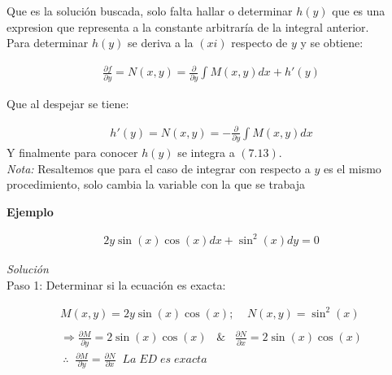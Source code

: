 Que es la solución buscada, solo falta hallar o determinar \(\displaystyle h(y)\) que es una expresion que representa a la constante arbitraría de la integral anterior.\\

Para determinar \(\displaystyle h(y)\) se deriva a la \(\displaystyle (xi)\) respecto de \(\displaystyle y\) y se obtiene:

\begin{equation}
    \begin{gathered}
        \frac{\partial{f}}{\partial{y}}=N(x,y)=\frac{\partial}{\partial{y}}\int M(x,y)dx + h'(y)
    \end{gathered}
\end{equation}

Que al despejar se tiene:

\begin{equation}
    \begin{gathered}
        h'(y)=N(x,y)=-\frac{\partial}{\partial{y}}\int M(x,y)dx
    \end{gathered}
\end{equation}
Y finalmente para conocer \(\displaystyle h(y)\) se integra a \(\displaystyle (7.13)\).\\

\textit{Nota: }Resaltemos que para el caso de integrar con respecto a \(\displaystyle y\) es el mismo procedimiento, solo cambia la variable con la que se trabaja

\clearpage

\textbf{Ejemplo}

\begin{equation}
    \begin{gathered}
        2y\sin(x)\cos(x)dx+\sin^{2}(x)dy=0
    \end{gathered}
\end{equation}

\textit{Solución}\\

Paso 1: Determinar si la ecuación es exacta:

\begin{equation*}
    \begin{gathered}
        M(x,y)=2y\sin(x)\cos(x);\;\;\;\;N(x,y)=\sin^{2}(x)\\\\
        \Rightarrow \frac{\partial{M}}{\partial{y}}=2\sin(x)\cos(x)\;\;\;\&\;\;\;\frac{\partial{N}}{\partial{x}}=2\sin(x)\cos(x)\\\
        \therefore\;\;\frac{\partial{M}}{\partial{y}}=\frac{\partial{N}}{\partial{x}}\;\;La\;ED\;es\;exacta
    \end{gathered}
\end{equation*}

